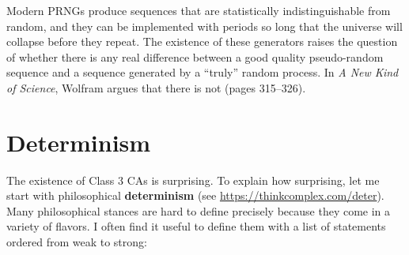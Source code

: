 \documentclass[12pt]{book}
\theoremstyle{exercise}
\newcommand{\py}{\verb}%}
\begin{document}


Modern PRNGs produce sequences that are statistically
indistinguishable from random, and they can be implemented with
periods so long that the universe will collapse before they repeat.
The existence of these generators raises the question of whether there
is any real difference between a good quality pseudo-random sequence
and a sequence generated by a ``truly'' random process.  In {\em A New
  Kind of Science}, Wolfram argues that there is not (pages 315--326).



\section{Determinism}
\label{determinism}

The existence of Class 3 CAs is surprising.  To explain how
surprising, let me start with philosophical
{\bf determinism} (see \url{https://thinkcomplex.com/deter}).
Many philosophical stances are hard to define precisely because
they come in a variety of flavors.  I often find it useful
to define them with a list of statements ordered from weak
to strong:
\end{document}
